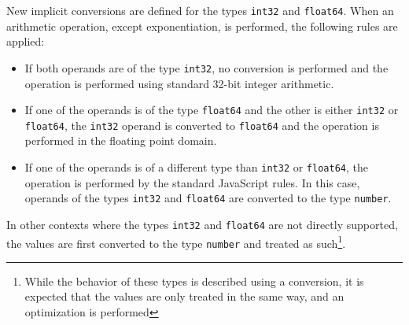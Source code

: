New implicit conversions are defined for the types \texttt{int32} and \texttt{float64}. When an arithmetic operation, except exponentiation, is performed, the following rules are applied:

\begin{itemize}
    \item If both operands are of the type \texttt{int32}, no conversion is performed and the operation is performed using standard 32-bit integer arithmetic.
    \item If one of the operands is of the type \texttt{float64} and the other is either \texttt{int32} or \texttt{float64}, the \texttt{int32} operand is converted to \texttt{float64} and the operation is performed in the floating point domain.
    \item If one of the operands is of a different type than \texttt{int32} or \texttt{float64}, the operation is performed by the standard JavaScript rules. In this case, operands of the types \texttt{int32} and \texttt{float64} are converted to the type \texttt{number}.
\end{itemize}

In other contexts where the types \texttt{int32} and \texttt{float64} are not directly supported, the values are first converted to the type \texttt{number} and treated as such\footnote{While the behavior of these types is described using a conversion, it is expected that the values are only treated in the same way, and an optimization is performed}.



